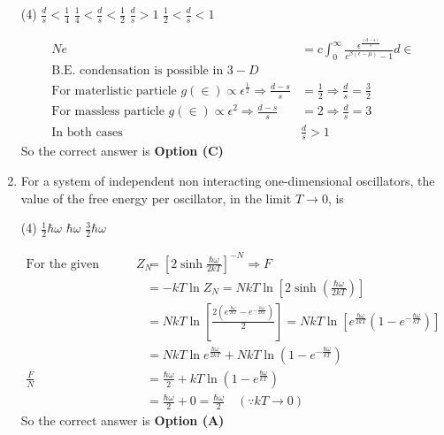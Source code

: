 \begin{enumerate}
\begin{tasks}(4)
	\task[\textbf{A.}] $\frac{d}{s}<\frac{1}{4}$
	\task[\textbf{B.}] $\frac{1}{4}<\frac{d}{s}<\frac{1}{2}$
	\task[\textbf{C.}] $\frac{d}{s}>1$
	\task[\textbf{D.}] $\frac{1}{2}<\frac{d}{s}<1$
\end{tasks}
\begin{answer}
	\begin{align*}
	N e&=c \int_{0}^{\infty} \frac{\epsilon^{\frac{(d-s)}{s}}}{e^{\beta(\epsilon-\mu)}-1} d \in\\
	\text{B.E. condensation is possible in $3-D$}\\
	\text{For materlistic particle }g(\in) \propto \epsilon^{\frac{1}{2}} \Rightarrow \frac{d-s}{s}&=\frac{1}{2} \Rightarrow \frac{d}{s}=\frac{3}{2}\\
	\text{For massless particle }g(\in) \propto \epsilon^{2} \Rightarrow \frac{d-s}{s}&=2 \Rightarrow \frac{d}{s}=3\\
	\text{In both cases }&\frac{d}{s}>1
	\end{align*}
	So the correct answer is \textbf{Option (C)}
\end{answer}
	\item For a system of independent non interacting one-dimensional oscillators, the value of the free energy per oscillator, in the limit $T \rightarrow 0$, is
	{}
\begin{tasks}(4)
	\task[\textbf{A.}] $\frac{1}{2} \hbar \omega$
	\task[\textbf{B.}] $\hbar \omega$
	\task[\textbf{C.}] $\frac{3}{2} \hbar \omega$
\end{tasks}
\begin{answer}
	\begin{align*}
	\text{For the given system }Z_{N}&=\left[2 \sinh \frac{\hbar \omega}{2 k T}\right]^{-N} \Rightarrow F\\&=-k T \ln Z_{N}=N k T \ln \left[2 \sinh \left(\frac{\hbar \omega}{2 k T}\right)\right]\\
	&=N k T \ln \left[\frac{2\left(e^{\frac{\hbar \omega}{2 k T}}-e^{-\frac{\hbar \omega}{2 k T}}\right)}{2}\right]=N k T \ln \left[e^{\frac{\hbar \omega}{2 k T}}\left(1-e^{-\frac{\hbar \omega}{k T}}\right)\right]\\&=N k T \ln e^{\frac{\hbar \omega}{2 k T}}+N k T \ln \left(1-e^{-\frac{\hbar \omega}{k T}}\right)\\
	\frac{F}{N}&=\frac{\hbar \omega}{2}+k T \ln \left(1-e^{\frac{\hbar \omega}{k T}}\right)\\&=\frac{\hbar \omega}{2}+0=\frac{\hbar \omega}{2}\quad (\because k T \rightarrow 0)
	\end{align*}
	So the correct answer is \textbf{Option (A)}
\end{answer}
\end{enumerate}

